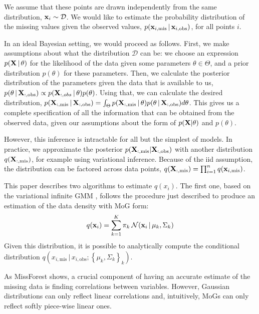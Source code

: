 \documentclass[letterpaper]{article}
\newcommand{\vbar}{\,|\,}
\newcommand{\vx}{{\bf x}}
\newcommand{\vX}{{\bf X}}
\newcommand{\mis}{\text{mis}}
\newcommand{\obs}{\text{obs}}
\begin{document}
We assume that
these points are drawn independently from the same distribution, $\vx_i \sim
\mathcal{D}$. We would like to estimate the probability distribution of the
missing values given the observed values, $p(\vx_{i,\mis} \vbar
\vx_{i,\obs})$, for all points $i$.

In an ideal Bayesian setting, we would proceed as
follows. First, we make assumptions about what the distribution $\mathcal{D}$ can be: we
choose an expression $p(\vX \vbar \theta)$ for the likelihood of the data given
some parameters $\theta \in \Theta$, and a prior distribution $p(\theta)$ for these
parameters.
Then, we calculate the posterior distribution of the parameters given the data
that is available to us, $p(\theta \vbar \vX_{:,\obs}) \propto
p(\vX_{:,obs} \vbar \theta)p(\theta)$. Using that, we can calculate the desired
distribution, $p(\vX_{:,\mis} \vbar \vX_{:,\obs}) = \int_\Theta
p(\vX_{:,\mis}\vbar \theta)p(\theta \vbar \vX_{:,\obs}) d\theta$. 
This gives us a complete specification of all the information that can be
obtained from the observed data, given our assumptions
about the form of $p(\vX | \theta)$ and $p(\theta)$.

However, this inference is intractable for all but the simplest of models. In
practice, we approximate the posterior $p(\vX_{:,\mis} | \vX_{:, \obs})$ with
another distribution $q(\vX_{:,\mis})$, for example using variational inference.
Because of the \ac{iid} assumption, the distribution can be factored across data
points, $q(\vX_{:,\mis}) = \prod_{i=1}^n q(\vx_{i,\mis})$.


This paper describes two algorithms to estimate $q(x_i)$. The first one,
based on the variational infinite \acl{GMM}
\citep{blei2006variational,BishopChristopherM2006Pram}, follows the procedure
just described to produce an estimation of the data density with \acf{MoG} form:
\begin{equation}
  q(\vx_i) = \sum_{k=1}^K \pi_k \: \mathcal{N}(\vx_i \vbar \mu_k, \Sigma_k)
  \label{eq:point-factored-mog}
\end{equation}
Given this distribution, it is possible to analytically compute
the conditional distribution
$q(x_{i,\mis} \vbar x_{i,\obs}; \left\{\mu_k, \Sigma_k\right\}_k)$.

As MissForest \citep{stekhoven2011missforest} shows, a crucial component of
having an accurate estimate of the missing data is finding correlations between
variables. However, Gaussian
distributions can only reflect linear correlations and, intuitively, \aclp{MoG}
can only reflect softly piece-wise linear ones.
\end{document}
